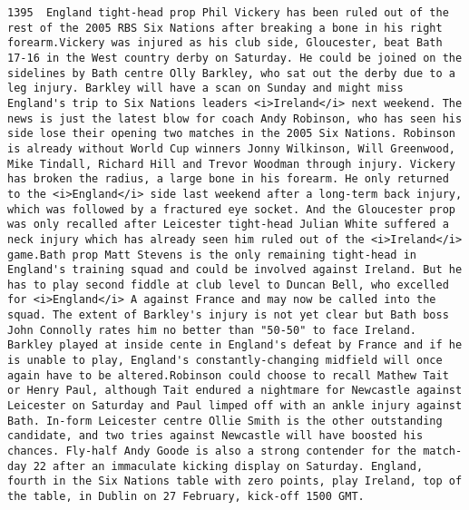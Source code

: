 \documentclass[11pt]{article}
\begin{document}
\begin{Verbatim}[commandchars=\\\{\}]
         1395  England tight-head prop Phil Vickery has been ruled out of the rest of the 2005 RBS Six Nations after breaking a bone in his right forearm.Vickery was injured as his club side, Gloucester, beat Bath 17-16 in the West country derby on Saturday. He could be joined on the sidelines by Bath centre Olly Barkley, who sat out the derby due to a leg injury. Barkley will have a scan on Sunday and might miss England's trip to Six Nations leaders <i>Ireland</i> next weekend. The news is just the latest blow for coach Andy Robinson, who has seen his side lose their opening two matches in the 2005 Six Nations. Robinson is already without World Cup winners Jonny Wilkinson, Will Greenwood, Mike Tindall, Richard Hill and Trevor Woodman through injury. Vickery has broken the radius, a large bone in his forearm. He only returned to the <i>England</i> side last weekend after a long-term back injury, which was followed by a fractured eye socket. And the Gloucester prop was only recalled after Leicester tight-head Julian White suffered a neck injury which has already seen him ruled out of the <i>Ireland</i> game.Bath prop Matt Stevens is the only remaining tight-head in England's training squad and could be involved against Ireland. But he has to play second fiddle at club level to Duncan Bell, who excelled for <i>England</i> A against France and may now be called into the squad. The extent of Barkley's injury is not yet clear but Bath boss John Connolly rates him no better than "50-50" to face Ireland. Barkley played at inside cente in England's defeat by France and if he is unable to play, England's constantly-changing midfield will once again have to be altered.Robinson could choose to recall Mathew Tait or Henry Paul, although Tait endured a nightmare for Newcastle against Leicester on Saturday and Paul limped off with an ankle injury against Bath. In-form Leicester centre Ollie Smith is the other outstanding candidate, and two tries against Newcastle will have boosted his chances. Fly-half Andy Goode is also a strong contender for the match-day 22 after an immaculate kicking display on Saturday. England, fourth in the Six Nations table with zero points, play Ireland, top of the table, in Dublin on 27 February, kick-off 1500 GMT.                                                                                                                                                                                                                                                                                                                                                                                                                                                                                                                                                                                                                                                                                                                                                                                                                                                                                                                                                                                                                                                                       
\end{Verbatim}
\end{document}
